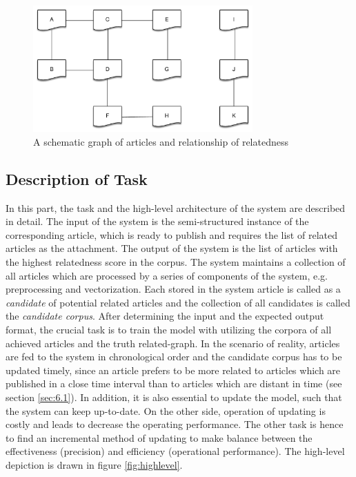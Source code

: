 \begin{figure}[!htb]
    \centering
    \includegraphics[width=0.75\textwidth]{fig/relatedness.pdf}
    \caption{A schematic graph of articles and relationship of relatedness}
    \label{fig:relatedness}
\end{figure}

\bigbreak
\subsection{Description of Task}
\label{sec:3.2}

In this part, the task and the high-level architecture of the system are described in detail. The input of the system is the semi-structured instance of the corresponding article, which is ready to publish and requires the list of related articles as the attachment. The output of the system is the list of articles with the highest relatedness score in the corpus. The system maintains a collection of all articles which are processed by a series of components of the system, e.g. preprocessing and vectorization. Each stored in the system article is called as a \textit{candidate} of potential related articles and the collection of all candidates is called the \textit{candidate corpus}. After determining the input and the expected output format, the crucial task is to train the model with utilizing the corpora of all achieved articles and the truth related-graph. In the scenario of reality, articles are fed to the system in chronological order and the candidate corpus has to be updated timely, since an article prefers to be more related to articles which are published in a close time interval than to articles which are distant in time (see section \ref{sec:6.1}). In addition, it is also essential to update the model, such that the system can keep up-to-date. On the other side, operation of updating is costly and leads to decrease the operating performance. The other task is hence to find an incremental method of updating to make balance between the effectiveness (precision) and efficiency (operational performance). The high-level depiction is drawn in figure \ref{fig:highlevel}. 

